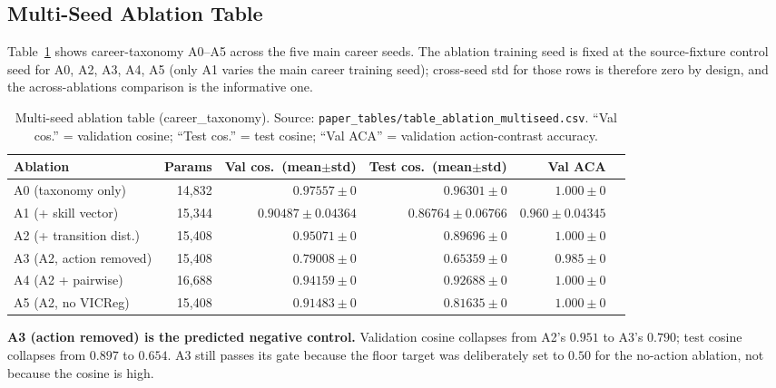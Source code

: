 \documentclass[10pt,twocolumn,letterpaper]{article}
\begin{document}
\subsection{Multi-Seed Ablation Table}

Table~\ref{tab:ablation-results} shows career-taxonomy A0--A5
across the five main career seeds. The ablation training seed is
fixed at the source-fixture control seed for A0, A2, A3, A4, A5
(only A1 varies the main career training seed); cross-seed std for
those rows is therefore zero by design, and the across-ablations
comparison is the informative one.

\begin{table}[t]
\caption{Multi-seed ablation table (career\_taxonomy). Source:
  \texttt{paper\_tables/table\_ablation\_multiseed.csv}.
  ``Val cos.'' = validation cosine; ``Test cos.'' = test cosine;
  ``Val ACA'' = validation action-contrast accuracy.}
\label{tab:ablation-results}
\centering\small
\begin{tabular}{lrrrrr}
\toprule
Ablation & Params & Val cos.\ (mean$\pm$std) & Test cos.\ (mean$\pm$std) & Val ACA \\
\midrule
A0 (taxonomy only)             & 14{,}832 & $0.97557 \pm 0$        & $0.96301 \pm 0$        & $1.000 \pm 0$ \\
A1 (+ skill vector)            & 15{,}344 & $0.90487 \pm 0.04364$  & $0.86764 \pm 0.06766$  & $0.960 \pm 0.04345$ \\
A2 (+ transition dist.)        & 15{,}408 & $0.95071 \pm 0$        & $0.89696 \pm 0$        & $1.000 \pm 0$ \\
A3 (A2, action removed)        & 15{,}408 & $0.79008 \pm 0$        & $0.65359 \pm 0$        & $0.985 \pm 0$ \\
A4 (A2 + pairwise)             & 16{,}688 & $0.94159 \pm 0$        & $0.92688 \pm 0$        & $1.000 \pm 0$ \\
A5 (A2, no VICReg)             & 15{,}408 & $0.91483 \pm 0$        & $0.81635 \pm 0$        & $1.000 \pm 0$ \\
\bottomrule
\end{tabular}
\end{table}

\textbf{A3 (action removed) is the predicted negative control.}
Validation cosine collapses from A2's $0.951$ to A3's $0.790$;
test cosine collapses from $0.897$ to $0.654$. A3 still passes its
gate because the floor target was deliberately set to $0.50$ for
the no-action ablation, not because the cosine is high.
\end{document}
